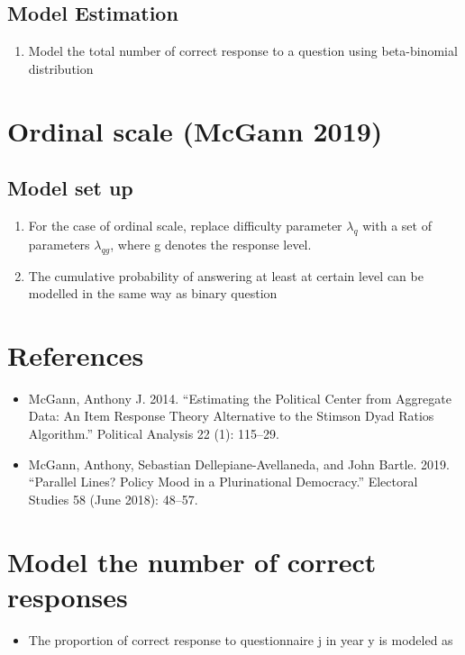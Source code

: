\documentclass{article}
\begin{document}
\subsection{Model Estimation}
    \begin{enumerate}
        \item Model the total number of correct response to a question using beta-binomial distribution 
        
    \end{enumerate}

\section{Ordinal scale (McGann 2019)}

\subsection{Model set up}
    \begin{enumerate}
        \item For the case of ordinal scale, replace difficulty parameter $\lambda_q$ with a set of parameters  $\lambda_{qg}$,  where g denotes the response level.  
        \item The cumulative probability of answering at least at certain level can be modelled in the same way as binary question
    \end{enumerate}


\section{References}

\begin{itemize}
    \item McGann, Anthony J. 2014. “Estimating the Political Center from Aggregate Data: An Item Response Theory Alternative to the Stimson Dyad Ratios Algorithm.” Political Analysis 22 (1): 115–29.  
    \item McGann, Anthony, Sebastian Dellepiane-Avellaneda, and John Bartle. 2019. “Parallel Lines? Policy Mood in a Plurinational Democracy.” Electoral Studies 58 (June 2018): 48–57. 
\end{itemize}


\section{Model the number of correct responses}
\begin{itemize}
    \item  The proportion of correct response to questionnaire j in year y is modeled as 
    
\end{itemize}
\end{document}
